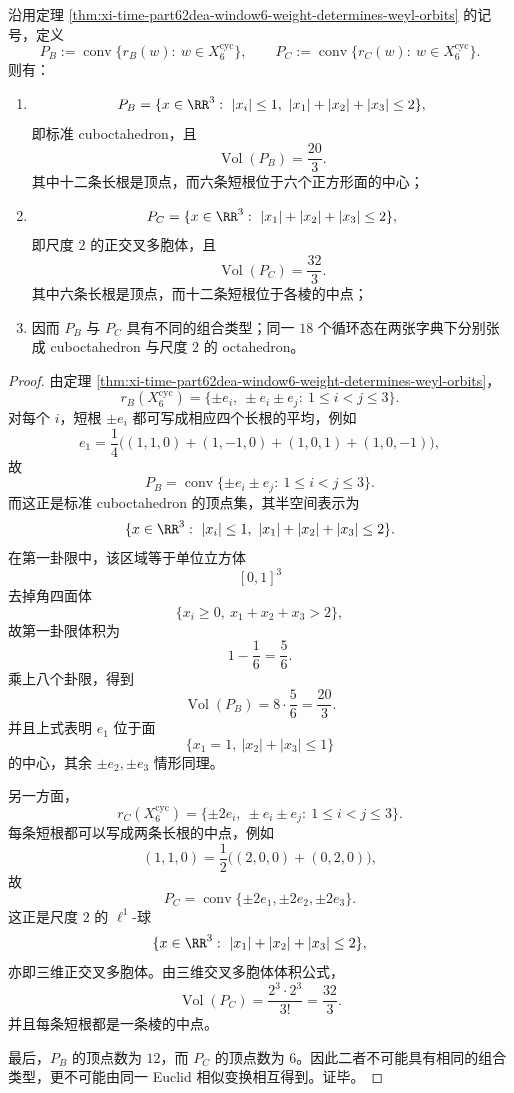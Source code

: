 \begin{theorem}\label{thm:xi-time-part62dea-window6-b3c3-root-polytopes-not-similar}
沿用定理 \ref{thm:xi-time-part62dea-window6-weight-determines-weyl-orbits} 的记号，定义
\[
P_B:=\operatorname{conv}\{r_B(w):\ w\in X_6^{\mathrm{cyc}}\},
\qquad
P_C:=\operatorname{conv}\{r_C(w):\ w\in X_6^{\mathrm{cyc}}\}.
\]
则有：
\begin{enumerate}
  \item
  \[
  P_B
  =
  \{x\in\RR^3:\ |x_i|\le 1,\ |x_1|+|x_2|+|x_3|\le 2\},
  \]
  即标准 cuboctahedron，且
  \[
  \operatorname{Vol}(P_B)=\frac{20}{3}.
  \]
  其中十二条长根是顶点，而六条短根位于六个正方形面的中心；
  \item
  \[
  P_C
  =
  \{x\in\RR^3:\ |x_1|+|x_2|+|x_3|\le 2\},
  \]
  即尺度 \(2\) 的正交叉多胞体，且
  \[
  \operatorname{Vol}(P_C)=\frac{32}{3}.
  \]
  其中六条长根是顶点，而十二条短根位于各棱的中点；
  \item 因而 \(P_B\) 与 \(P_C\) 具有不同的组合类型；同一 \(18\) 个循环态在两张字典下分别张成 cuboctahedron 与尺度 \(2\) 的 octahedron。
\end{enumerate}
\end{theorem}
\begin{proof}
由定理 \ref{thm:xi-time-part62dea-window6-weight-determines-weyl-orbits}，
\[
r_B(X_6^{\mathrm{cyc}})
=
\{\pm e_i,\ \pm e_i\pm e_j:\ 1\le i<j\le 3\}.
\]
对每个 \(i\)，短根 \(\pm e_i\) 都可写成相应四个长根的平均，例如
\[
e_1=
\frac14\bigl((1,1,0)+(1,-1,0)+(1,0,1)+(1,0,-1)\bigr),
\]
故
\[
P_B=\operatorname{conv}\{\pm e_i\pm e_j:\ 1\le i<j\le 3\}.
\]
而这正是标准 cuboctahedron 的顶点集，其半空间表示为
\[
\{x\in\RR^3:\ |x_i|\le 1,\ |x_1|+|x_2|+|x_3|\le 2\}.
\]
在第一卦限中，该区域等于单位立方体
\[
[0,1]^3
\]
去掉角四面体
\[
\{x_i\ge 0,\ x_1+x_2+x_3>2\},
\]
故第一卦限体积为
\[
1-\frac16=\frac56.
\]
乘上八个卦限，得到
\[
\operatorname{Vol}(P_B)=8\cdot \frac56=\frac{20}{3}.
\]
并且上式表明 \(e_1\) 位于面
\[
\{x_1=1,\ |x_2|+|x_3|\le 1\}
\]
的中心，其余 \(\pm e_2,\pm e_3\) 情形同理。

另一方面，
\[
r_C(X_6^{\mathrm{cyc}})
=
\{\pm 2e_i,\ \pm e_i\pm e_j:\ 1\le i<j\le 3\}.
\]
每条短根都可以写成两条长根的中点，例如
\[
(1,1,0)=\frac12\bigl((2,0,0)+(0,2,0)\bigr),
\]
故
\[
P_C=\operatorname{conv}\{\pm 2e_1,\pm 2e_2,\pm 2e_3\}.
\]
这正是尺度 \(2\) 的 \(\ell^1\)-球
\[
\{x\in\RR^3:\ |x_1|+|x_2|+|x_3|\le 2\},
\]
亦即三维正交叉多胞体。由三维交叉多胞体体积公式，
\[
\operatorname{Vol}(P_C)=\frac{2^3\cdot 2^3}{3!}=\frac{32}{3}.
\]
并且每条短根都是一条棱的中点。

最后，\(P_B\) 的顶点数为 \(12\)，而 \(P_C\) 的顶点数为 \(6\)。因此二者不可能具有相同的组合类型，更不可能由同一 Euclid 相似变换相互得到。证毕。
\end{proof}

